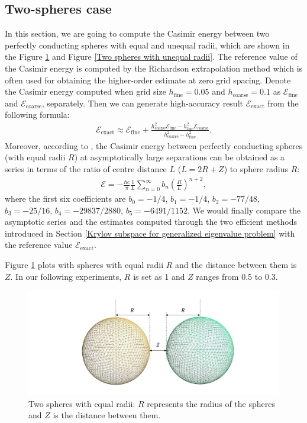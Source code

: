 \subsection{Two-spheres case}

In this section, we are going to compute the Casimir energy between two perfectly conducting spheres with equal and unequal radii, which are shown in the 
Figure \ref{Two spheres with equal radii} and Figure \ref{Two spheres with unequal radii}. The reference value of the Casimir energy is computed by the Richardson extrapolation method which is often used 
for obtaining the higher-order estimate at zero grid spacing. Denote the Casimir energy computed when grid size $h_{\text{fine}} = 0.05$ and 
$h_{\text{coarse}} = 0.1$ as $\mathcal{E}_{\text{fine}}$ and $\mathcal{E}_{\text{coarse}}$, separately. Then we can generate high-accuracy result 
$\mathcal{E}_{\text{exact}}$ from the following formula:
\begin{align*}
    \mathcal{E}_{\text{exact}} \approx \mathcal{E}_{\text{fine}} + \frac{h_{\text{coarse}}^{2}\mathcal{E}_{\text{fine}} - h_{\text{fine}}^{2}\mathcal{E}_{\text{coarse}}}{h_{\text{coarse}}^{2} - h_{\text{fine}}^{2}}.
\end{align*}
Moreover, according to \cite{emig2008casimir}, the Casimir energy between perfectly conducting spheres (with equal radii $R$) at asymptotically large 
separations can be obtained as a series in terms of the ratio of centre distance $L$ ($L = 2R + Z$) to sphere radius $R$:
\begin{align}\label{Asymptotic equal radii}
   \mathcal{E} = -\frac{\hbar c}{\pi}\frac{1}{L}\sum_{n=0}^{\infty}b_{n}\left(\frac{R}{L}\right)^{n+2},
\end{align}
where the first six coefficients are 
$b_{0} = -1/4$, $b_{1} = -1/4$,  $b_{2} = -77/48$,  $b_{3} = -25/16$,  $b_{4} = -29837/2880$, $b_{5} = -6491/1152$. We would finally compare 
the asymptotic series and the estimates computed through the two efficient methods introduced in Section \ref{Krylov subspace for generalized eigenvalue problem} 
with the reference value $\mathcal{E}_{\text{exact}}$.

Figure \ref{Two spheres with equal radii} plots with spheres with equal radii $R$ and the distance between them is $Z$. In our following experiments, $R$ is set as 1 and 
$Z$ ranges from 0.5 to 0.3. 
\begin{figure}[H]
    \includegraphics[scale = 0.6]{figures/Grid_two_spheres_dist.png}
    \caption{Two spheres with equal radii: $R$ represents the radius of the spheres and $Z$ is the distance between them.}
    \label{Two spheres with equal radii}
\end{figure}

